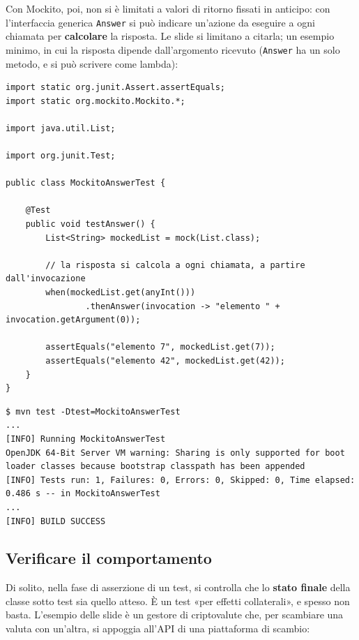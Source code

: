 Con Mockito, poi, non si è limitati a valori di ritorno fissati in anticipo: con l'interfaccia generica
\texttt{Answer} si può indicare un'azione da eseguire a ogni chiamata per \textbf{calcolare} la risposta. Le slide si
limitano a citarla; un esempio minimo, in cui la risposta dipende dall'argomento ricevuto (\texttt{Answer} ha un solo
metodo, e si può scrivere come lambda):

\begin{lstlisting}[style=java, name=MockitoAnswerTest.java]
import static org.junit.Assert.assertEquals;
import static org.mockito.Mockito.*;

import java.util.List;

import org.junit.Test;

public class MockitoAnswerTest {

    @Test
    public void testAnswer() {
        List<String> mockedList = mock(List.class);

        // la risposta si calcola a ogni chiamata, a partire dall'invocazione
        when(mockedList.get(anyInt()))
                .thenAnswer(invocation -> "elemento " + invocation.getArgument(0));

        assertEquals("elemento 7", mockedList.get(7));
        assertEquals("elemento 42", mockedList.get(42));
    }
}
\end{lstlisting}

\begin{lstlisting}[style=shell, name=Terminale]
$ mvn test -Dtest=MockitoAnswerTest
...
[INFO] Running MockitoAnswerTest
OpenJDK 64-Bit Server VM warning: Sharing is only supported for boot loader classes because bootstrap classpath has been appended
[INFO] Tests run: 1, Failures: 0, Errors: 0, Skipped: 0, Time elapsed: 0.486 s -- in MockitoAnswerTest
...
[INFO] BUILD SUCCESS
\end{lstlisting}

\subsection{Verificare il comportamento}

Di solito, nella fase di asserzione di un test, si controlla che lo \textbf{stato finale} della classe sotto test sia
quello atteso. È un test «per effetti collaterali», e spesso non basta. L'esempio delle slide è un gestore di
criptovalute che, per scambiare una valuta con un'altra, si appoggia all'API di una piattaforma di scambio:

